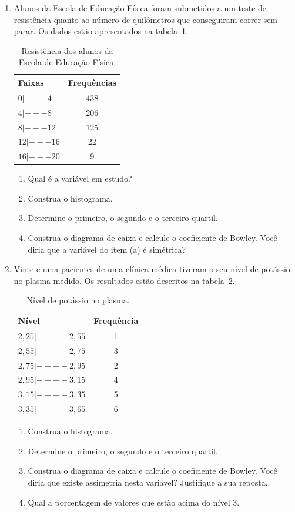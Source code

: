 \documentclass[12pt, a4paper]{article}
\begin{document}
\begin{enumerate}[1-]
	\item Alunos da Escola de Educação Física foram submetidos a um teste de resistência quanto ao número de quilômetros que conseguiram correr sem parar. Os dados estão apresentados na tabela~\ref{tab:resistencia}.
	\begin{table}[htbp]
		\centering
		\caption{Resistência dos alunos da Escola de Educação Física.}
		\label{tab:resistencia}
		\begin{tabular}{l|c}
			\toprule
			Faixas & Frequências \\ \midrule
			$0 |--- 4$ & 438\\
			$4 |--- 8$  & 206 \\
			$8 |--- 12$ & 125 \\
			$12 |--- 16$ & 22\\
			$16 |--- 20$ & 9 \\ \toprule
		\end{tabular}
	\end{table}
	\begin{enumerate}
		\item Qual é a variável em estudo?
		\item Construa o histograma.
		\item Determine o primeiro, o segundo e o terceiro quartil.
		\item Construa o diagrama de caixa e calcule o coeficiente de Bowley. Você diria que a variável do item (a) é simétrica?
	\end{enumerate}
	
	\item Vinte e uma pacientes de uma clínica médica tiveram o seu nível de potássio no plasma medido. Os resultados estão descritos na tabela~\ref{tab:potassio}.
	\begin{table}[htbp]
		\centering
		\caption{Nível de potássio no plasma.}
		\label{tab:potassio}
		\begin{tabular}{l|c}
			\toprule
			Nível & Frequência\\ \midrule
			$2,25 |---- 2,55$ & 1\\
			$2,55 |---- 2,75$ & 3\\
			$2,75 |---- 2,95$ & 2\\
			$2,95 |---- 3,15$ & 4\\
			$3,15 |---- 3,35$ & 5\\
			$3,35 |---- 3,65$ & 6\\ \toprule 
		\end{tabular}
		\begin{enumerate}
			\item Construa o histograma.
			\item Determine o primeiro, o segundo e o terceiro quartil.
			\item Construa o diagrama de caixa e calcule o coeficiente de Bowley. Você diria que existe assimetria nesta variável? Justifique a sua reposta.
			\item Qual a porcentagem de valores que estão acima do nível 3.
		\end{enumerate}
	\end{table}
	

\end{enumerate}
\end{document}
